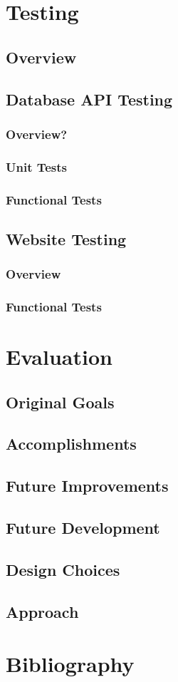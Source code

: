 \documentclass[11pt]{article}
\begin{document}
\section{Testing}
	\subsection{Overview}
	\subsection{Database API Testing}
		\subsubsection{Overview?}
		\subsubsection{Unit Tests}
		\subsubsection{Functional Tests}
	\subsection{Website Testing}
		\subsubsection{Overview}
		\subsubsection{Functional Tests}
		
\section{Evaluation}
	\subsection{Original Goals}
	\subsection{Accomplishments}
	\subsection{Future Improvements}
	\subsection{Future Development}
	\subsection{Design Choices}
	\subsection{Approach}
	
\section{Bibliography}
	
\end{document}
